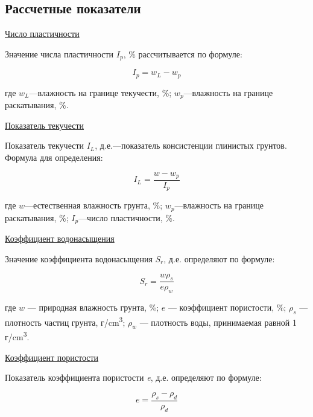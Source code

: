 
\subsection{Рассчетные показатели}

\underline{Число пластичности}

 Значение числа пластичности $I_p$, \% рассчитывается по формуле:

 \[
    I_p = w_L-w_p
 \]

 где $w_L$---влажность на границе текучести, \%;
 $w_p$---влажность на границе раскатывания, \%.
 
\underline{Показатель текучести}

 Показатель текучести \textit{$I_L$}, д.е.---показатель консистенции глинистых грунтов.
 Формула для определения: 

\[
   I_L = \frac{w-w_p}{I_p}
\]

где $w$---естественная влажность грунта, \%;
$w_p$---влажность на границе раскатывания, \%;
$I_p$---число пластичности, \%.

\underline{Коэффициент водонасыщения}

Значение коэффициента водонасыщения \textit{$S_r$}, д.е. определяют по формуле:

\[
   S_r = \frac{w \rho_s}{e \rho_w}
\]

где $w$ --- природная влажность грунта, \%;
$e$ --- коэффициент пористости, \%;
$\rho_s$ --- плотность частиц грунта, г/\si{\centi\meter^3};
$\rho_w$ --- плотность воды, принимаемая равной 1 г/\si{\centi\meter^3}.

\underline{Коэффициент пористости}

Показатель коэффициента пористости  \textit{e}, д.е. определяют по формуле: 

\[
   \textit{e} = \frac{\rho_s-\rho_d}{\rho_d}
\]

